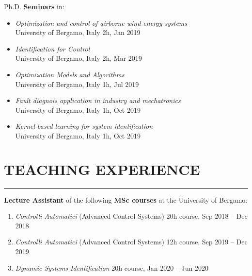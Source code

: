 \documentclass[10pt]{article}
\newcommand{\cvsection}[1]{\section*{\centering\normalsize\uppercase{#1}}\vspace{-16pt}\rule{\linewidth}{0.2pt}}
\begin{document}
\vspace{6pt} %

Ph.D. \textbf{Seminars} in:
\begin{itemize}	
	\setlength\itemsep{-3pt}
	\renewcommand\labelitemi{$\vcenter{\hbox{\tiny$\bullet$}}$}
	\item \textit{Optimization and control of airborne wind energy systems}\\
	University of Bergamo, Italy \hfill 2h, Jan 2019\\
	\item \textit{Identification for Control}\\
	University of Bergamo, Italy \hfill 2h, Mar 2019\\
	\item \textit{Optimization Models and Algorithms}\\
	University of Bergamo, Italy \hfill 1h, Jul 2019\\
	\item \textit{Fault diagnois application in industry and mechatronics}\\
	University of Bergamo, Italy \hfill 1h, Oct 2019\\
	\item \textit{Kernel-based learning for system identification}\\
	University of Bergamo, Italy \hfill 1h, Oct 2019\\
\end{itemize}


\cvsection{teaching experience}

\textbf{Lecture Assistant} of the following \textbf{MSc courses} at the University of Bergamo:
\begin{enumerate}
	\setlength\itemsep{-3pt}
	\item \textit{Controlli Automatici} (Advanced Control Systems) \hfill 20h course, Sep 2018 – Dec 2018\\
	\item \textit{Controlli Automatici} (Advanced Control Systems) \hfill 12h course, Sep 2019 – Dec 2019\\
	\item \textit{Dynamic Systems Identification} \hfill 20h course, Jan 2020 – Jun 2020\\
\end{enumerate}
\end{document}
